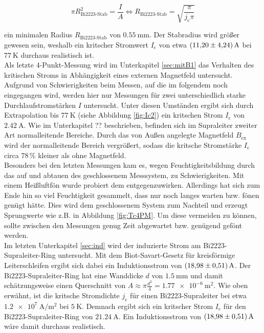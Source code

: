 \begin{equation*}
  \pi R_{\text{Bi2223-Stab}}^2 = \frac{I}{A}
  \iff
  R_{\text{Bi2223-Stab}} = \sqrt{\frac{\pi}{j_{\text{c}}\pi}}
\end{equation*}

\noindent
ein minimalen Radius $R_{\text{Bi2223-Stab}}$ von $\SI{0.55}{\milli\meter}$.
Der Stabradius wird größer gewesen sein, weshalb ein kritscher Stromwert
$I_{\text{c}}$ von etwa $\SI{11.2\pm4,24}{\ampere}$ bei $\SI{77}{\kelvin}$ durchaus
realistisch ist.\\
Als letzte 4-Punkt-Messung wird im Unterkapitel \ref{sec:mitB1} das Verhalten des
kritischen Stroms in Abhängigkeit eines externen Magnetfeld untersucht.
Aufgrund von Schwierigkeiten beim Messen, auf die im folgendem noch eingegangen wird,
werden hier nur Messungen für zwei unterschiedlich starke Durchlaufstromstärken $I$
untersucht. Unter diesen Umständen ergibt sich durch Extrapolation bis $\SI{77}{\kelvin}$
(siehe Abbildung \ref{fig:Ic2}) ein kritschen Strom $I_{\text{c}}$ von $\SI{2,42}{\ampere}$.
Wie im Unterkapitel ?? beschrieben, befinden sich im Supraleiter zweiter Art
normalleitende Bereiche. Durch das von Außen angelegte Magnetfeld $B_{\text{ex}}$
wird der normalleitende Bereich vergrößert, sodass die kritsche Stromstärke
$I_{\text{c}}$ circa 78$\,$\% kleiner als ohne Magnetfeld.\\
Besonders bei den letzten Messungen kam es, wegen Feuchtigkeitsbildung durch das
auf und abtauen des geschlossenem Messsystem, zu Schwierigkeiten. Mit einem Heißluftfön
wurde probiert dem entgegenzuwirken. Allerdings hat sich zum Ende hin so viel
Feuchtigkeit gesammelt, dass nur noch langes warten bzw. fönen genügt hätte. Dies
wird dem geschlossenem System zum Nachteil und erzeugt Sprungwerte wie z.B. in
Abbildung \ref{fig:Tc4PM}. Um diese vermeiden zu können, sollte zwischen den
Messungen genug Zeit abgewartet bzw. genügend gefönt werden.\\
Im letzten Unterkapitel \ref{sec:ind} wird der induzierte Strom am Bi2223-Supraleiter-Ring
untersucht. Mit dem Biot-Savart-Gesetz für kreisförmige Leiterschleifen ergibt
sich dabei ein Induktionsstrom von $\SI{18,98\pm0.51}{\ampere}$. Der Bi2223-Supraleiter-Ring
hat eine Wanddicke $d$ von $\SI{1,5}{\milli\meter}$ und damit schätzungsweise einen
Querschnitt von $A \approx \pi \frac{d^2}{4} = \SI{1,77e-6}{\meter\squared}$.
Wie oben erwähnt, ist die kritsche Stromdichte $j_{\text{c}}$ für einen Bi2223-Supraleiter
bei etwa $\SI{1.2e7}{\ampere\per\metre\squared}$ bei $\SI{5}{\kelvin}$. Demnach
ergibt sich ein kritscher Strom $I_{\text{c}}$ für den Bi2223-Supraleiter-Ring
von $\SI{21,24}{\ampere}$. Ein Induktionsstrom von $\SI{18,98\pm0,51}{\ampere}$
wäre damit durchaus realistisch.
